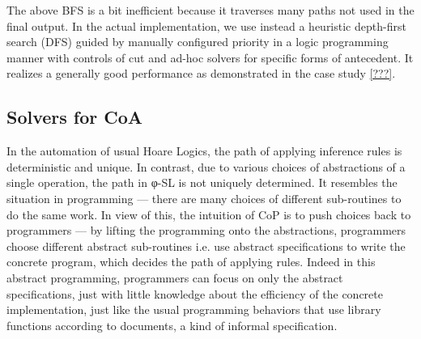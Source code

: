 The above BFS is a bit inefficient because it traverses many paths not used in the final output.
In the actual implementation, we use instead a heuristic depth-first search (DFS) guided by manually configured priority in a logic programming manner with controls of cut and ad-hoc solvers for specific forms of antecedent.
It realizes a generally good performance as demonstrated in the case study \cref{???}.

\subsection{Solvers for CoA}\label{solve-CoA}

In the automation of usual Hoare Logics, the path of applying inference rules is deterministic and unique.
In contrast, due to various choices of abstractions of a single operation, the path in φ-SL is not uniquely determined.
It resembles the situation in programming --- there are many choices of different sub-routines to do the same work.
In view of this, the intuition of CoP is to push choices back to programmers --- by lifting the programming onto the abstractions, programmers choose different abstract sub-routines i.e. use abstract specifications to write the concrete program, which decides the path of applying rules.
Indeed in this abstract programming, programmers can focus on only the abstract specifications, just with little knowledge about the efficiency of the concrete implementation, just like the usual programming behaviors that use library functions according to documents, a kind of informal specification.


